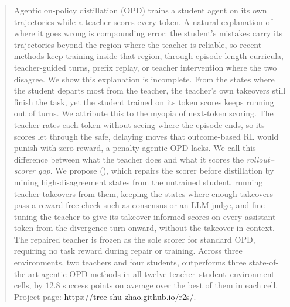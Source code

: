 \begin{abstract}
Agentic on-policy distillation (OPD) trains a student agent on its own trajectories while a teacher scores every token. A natural explanation of where it goes wrong is compounding error: the student's mistakes carry its trajectories beyond the region where the teacher is reliable, so recent methods keep training inside that region, through episode-length curricula, teacher-guided turns, prefix replay, or teacher intervention where the two disagree. We show this explanation is incomplete. From the states where the student departs most from the teacher, the teacher's own takeovers still finish the task, yet the student trained on its token scores keeps running out of turns. We attribute this to the myopia of next-token scoring. The teacher rates each token without seeing where the episode ends, so its scores let through the safe, delaying moves that outcome-based RL would punish with zero reward, a penalty agentic OPD lacks. We call this difference between what the teacher does and what it scores the \emph{rollout--scorer gap}. We propose \methodlong{} (\method{}), which repairs the scorer before distillation by mining high-disagreement states from the untrained student, running teacher takeovers from them, keeping the states where enough takeovers pass a reward-free check such as consensus or an LLM judge, and fine-tuning the teacher to give its takeover-informed scores on every assistant token from the divergence turn onward, without the takeover in context. The repaired teacher is frozen as the sole scorer for standard OPD, requiring no task reward during repair or training. Across three environments, two teachers and four students, \method{} outperforms three state-of-the-art agentic-OPD methods in all twelve teacher--student--environment cells, by $12.8$ success points on average over the best of them in each cell. Project page: \url{https://tree-shu-zhao.github.io/r2s/}.
\end{abstract}
